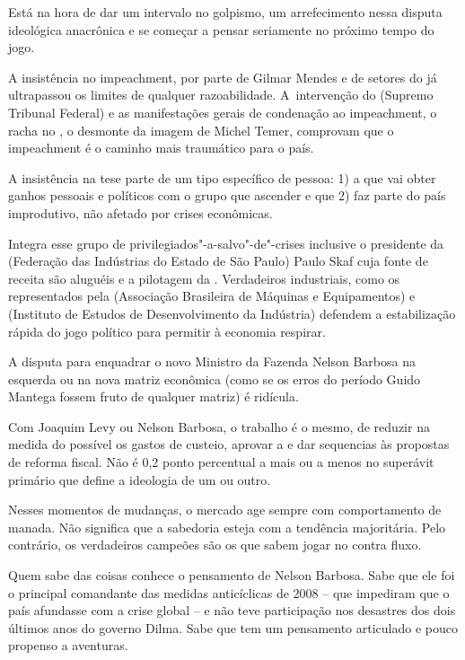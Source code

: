  

Está na hora de dar um intervalo no golpismo, um arrefecimento nessa
disputa ideológica anacrônica e se começar a pensar seriamente no
próximo tempo do jogo.

A insistência no impeachment, por parte de Gilmar Mendes e de setores do
 já ultrapassou os limites de qualquer razoabilidade. A~intervenção
do  (Supremo Tribunal Federal) e as manifestações gerais de
condenação ao impeachment, o racha no , o desmonte da imagem de
Michel Temer, comprovam que o impeachment é o caminho mais traumático
para o país.

A insistência na tese parte de um tipo específico de pessoa: 1) a que
vai obter ganhos pessoais e políticos com o grupo que ascender e que 2)
faz parte do país improdutivo, não afetado por crises econômicas.

Integra esse grupo de privilegiados"-a-salvo"-de"-crises inclusive o
presidente da  (Federação das Indústrias do Estado de São Paulo)
Paulo Skaf cuja fonte de receita são aluguéis e a pilotagem da .
Verdadeiros industriais, como os representados pela  (Associação
Brasileira de Máquinas e Equipamentos) e  (Instituto de Estudos de
Desenvolvimento da Indústria) defendem a estabilização rápida do jogo
político para permitir à economia respirar.

\asterisc{}

A disputa para enquadrar o novo Ministro da Fazenda Nelson Barbosa na
esquerda ou na nova matriz econômica (como se os erros do período Guido
Mantega fossem fruto de qualquer matriz) é ridícula.

Com Joaquim Levy ou Nelson Barbosa, o trabalho é o mesmo, de reduzir na
medida do possível os gastos de custeio, aprovar a  e dar sequencias
às propostas de reforma fiscal. Não é 0,2 ponto percentual a mais ou a
menos no superávit primário que define a ideologia de um ou outro.

\asterisc{}

Nesses momentos de mudanças, o mercado age sempre com comportamento de
manada. Não significa que a sabedoria esteja com a tendência
majoritária. Pelo contrário, os verdadeiros campeões são os que sabem
jogar no contra fluxo.

Quem sabe das coisas conhece o pensamento de Nelson Barbosa. Sabe que
ele foi o principal comandante das medidas anticíclicas de 2008 -- que
impediram que o país afundasse com a crise global -- e não teve
participação nos desastres dos dois últimos anos do governo Dilma. Sabe
que tem um pensamento articulado e pouco propenso a aventuras.

